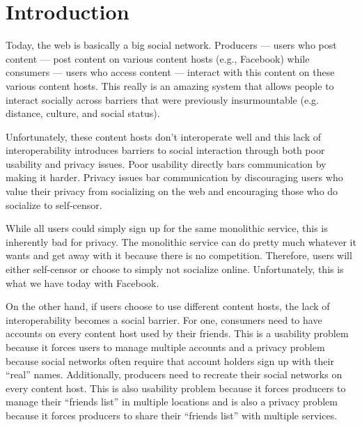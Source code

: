 \documentclass[pdftex,12pt,a4papaer,twoside,notitlepage]{report}
\begin{document}
\restoregeometry

\cleardoublepage

\tableofcontents

\cleardoublepage

\setlength{\parskip}{1.5em}
                                              
\chapter{Introduction} 

Today, the web is basically a big social network. Producers --- users who post
content --- post content on various content hosts (e.g., Facebook) while
consumers --- users who access content --- interact with this content on these
various content hosts. This really is an amazing system that allows people to
interact socially across barriers that were previously insurmountable (e.g.
distance, culture, and social status).

Unfortunately, these content hosts don't interoperate well and this lack of
interoperability introduces barriers to social interaction through both poor
usability and privacy issues. Poor usability directly bars communication by
making it harder. Privacy issues bar communication by discouraging users who
value their privacy from socializing on the web and encouraging those who do
socialize to self-censor.

While all users could simply sign up for the same monolithic service, this is
inherently bad for privacy. The monolithic service can do pretty much whatever
it wants and get away with it because there is no competition. Therefore, users
will either self-censor or choose to simply not socialize online. Unfortunately,
this is what we have today with Facebook.

On the other hand, if users choose to use different content hosts, the lack of
interoperability becomes a social barrier. For one, consumers need to have
accounts on every content host used by their friends. This is a usability
problem because it forces users to manage multiple accounts and a privacy
problem because social networks often require that account holders sign up with
their ``real'' names. Additionally, producers need to recreate their social
networks on every content host. This is also usability problem because it forces
producers to manage their ``friends list'' in multiple locations and is also a
privacy problem because it forces producers to share their ``friends list'' with
multiple services.
\end{document}
